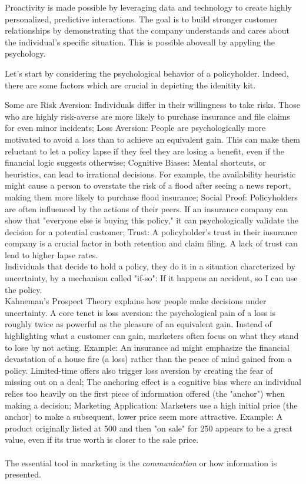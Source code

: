 \documentclass{article}
\begin{document}
Proactivity is made possible by leveraging data and technology to create highly personalized, predictive interactions. The goal is to build stronger customer relationships by demonstrating that the company understands and cares about the individual's specific situation. This is possible aboveall by appyling the psychology.


Let's start by considering the psychological behavior of a policyholder. Indeed, there are some factors which are crucial in depicting the idenitity kit.

 Some are Risk Aversion: Individuals differ in their willingness to take risks. Those who are highly risk-averse are more likely to purchase insurance and file claims for even minor incidents; Loss Aversion: People are psychologically more motivated to avoid a loss than to achieve an equivalent gain. This can make them reluctant to let a policy lapse if they feel they are losing a benefit, even if the financial logic suggests otherwise; Cognitive Biases: Mental shortcuts, or heuristics, can lead to irrational decisions. For example, the availability heuristic might cause a person to overstate the risk of a flood after seeing a news report, making them more likely to purchase flood insurance; Social Proof: Policyholders are often influenced by the actions of their peers. If an insurance company can show that "everyone else is buying this policy," it can psychologically validate the decision for a potential customer; Trust: A policyholder's trust in their insurance company is a crucial factor in both retention and claim filing. A lack of trust can lead to higher lapse rates.\\
Individuals that decide to hold a policy, they do it in a situation charcterized by uncertainty, by a mechanism called "if-so": If it happens an accident, so I can use the policy.\\
Kahneman's Prospect Theory explains how people make decisions under uncertainty. A core tenet is loss aversion: the psychological pain of a loss is roughly twice as powerful as the pleasure of an equivalent gain. Instead of highlighting what a customer can gain, marketers often focus on what they stand to lose by not acting. Example: An insurance ad might emphasize the financial devastation of a house fire (a loss) rather than the peace of mind gained from a policy. Limited-time offers also trigger loss aversion by creating the fear of missing out on a deal; The anchoring effect is a cognitive bias where an individual relies too heavily on the first piece of information offered (the "anchor") when making a decision; Marketing Application: Marketers use a high initial price (the anchor) to make a subsequent, lower price seem more attractive. Example: A product originally listed at 500 and then "on sale" for 250 appears to be a great value, even if its true worth is closer to the sale price.\\\\
The essential tool in marketing is the \textit{communication} or how information is presented. 
\end{document}
